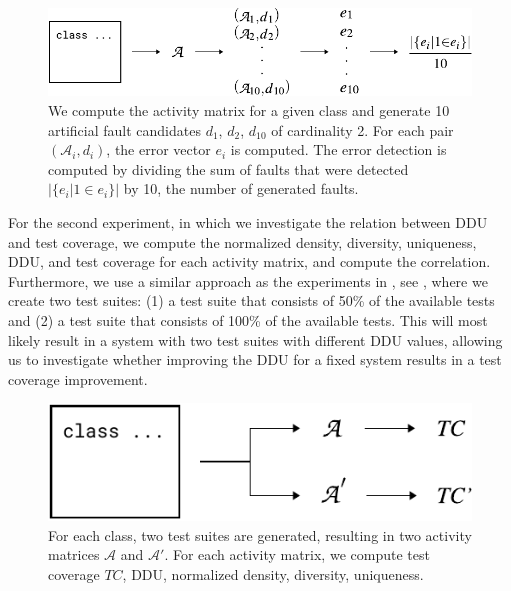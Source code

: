 \documentclass[twoside,a4paper,11pt]{memoir}
\begin{document}
\begin{figure}[b]
  \includegraphics[width=\linewidth]{figures/error_detection}
  \caption{We compute the activity matrix for a given class and generate 10 artificial fault candidates \(d_1 \), \(d_2 \), \(d_{10}\) of cardinality 2. For each pair \((\mathcal{A}_i, d_i) \), the error vector \(e_i \) is computed. The error detection is computed by dividing the sum of faults that were detected \(|\{e_i | 1 \in e_i \}|\) by 10, the number of generated faults.}%
  \label{fig:error_detection_computation}
\end{figure}

For the second experiment, in which we investigate the relation between DDU and test coverage, we compute the normalized density, diversity, uniqueness, DDU, and test coverage for each activity matrix, and compute the correlation.
Furthermore, we use a similar approach as the experiments in , see , where we create two test suites: (1) a test suite that consists of 50\% of the available tests and (2) a test suite that consists of 100\% of the available tests.
This will most likely result in a system with two test suites with different DDU values, allowing us to investigate whether improving the DDU for a fixed system results in a test coverage improvement.
\begin{figure}
  \center%
  \includegraphics[width=0.6\linewidth]{figures/delta_test_coverage_approach}
  \caption{For each class, two test suites are generated, resulting in two activity matrices \(\mathcal{A} \) and \(\mathcal{A}' \). For each activity matrix, we compute test coverage \(TC \), DDU, normalized density, diversity, uniqueness.}%
  \label{fig:delta_test_coverage_approach}
\end{figure}
\end{document}
